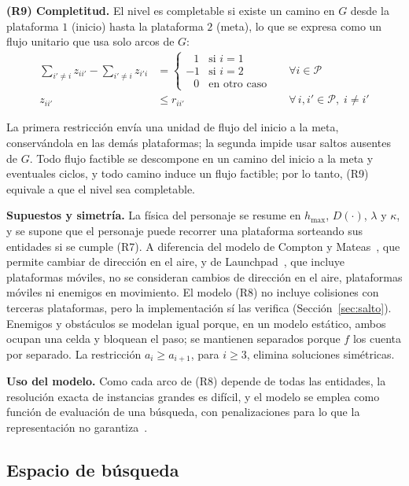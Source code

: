 \documentclass[letter, 10pt]{article}
\begin{document}
\textbf{(R9) Completitud.} El nivel es completable si existe un camino en $G$ desde la plataforma $1$ (inicio) hasta la plataforma $2$ (meta), lo que se expresa como un flujo unitario que usa solo arcos de $G$:
\begin{align}
\sum_{i' \neq i} z_{ii'} - \sum_{i' \neq i} z_{i'i} &= \begin{cases} \;\;\,1 & \text{si } i = 1 \\ -1 & \text{si } i = 2 \\ \;\;\,0 & \text{en otro caso} \end{cases} && \forall i \in \mathcal{P} \\
z_{ii'} &\leq r_{ii'} && \forall\, i, i' \in \mathcal{P},\; i \neq i'
\end{align}

La primera restricci\'on env\'ia una unidad de flujo del inicio a la meta, conserv\'andola en las dem\'as plataformas; la segunda impide usar saltos ausentes de $G$. Todo flujo factible se descompone en un camino del inicio a la meta y eventuales ciclos, y todo camino induce un flujo factible; por lo tanto, (R9) equivale a que el nivel sea completable.

\textbf{Supuestos y simetr\'ia.} La f\'isica del personaje se resume en $h_{\max}$, $D(\cdot)$, $\lambda$ y $\kappa$, y se supone que el personaje puede recorrer una plataforma sorteando sus entidades si se cumple (R7). A diferencia del modelo de Compton y Mateas~\cite{Compton2006}, que permite cambiar de direcci\'on en el aire, y de Launchpad~\cite{Smith2011}, que incluye plataformas m\'oviles, no se consideran cambios de direcci\'on en el aire, plataformas m\'oviles ni enemigos en movimiento. El modelo (R8) no incluye colisiones con terceras plataformas, pero la implementaci\'on s\'i las verifica (Secci\'on~\ref{sec:salto}). Enemigos y obst\'aculos se modelan igual porque, en un modelo est\'atico, ambos ocupan una celda y bloquean el paso; se mantienen separados porque $f$ los cuenta por separado. La restricci\'on $a_i \geq a_{i+1}$, para $i \geq 3$, elimina soluciones sim\'etricas.

\textbf{Uso del modelo.} Como cada arco de (R8) depende de todas las entidades, la resoluci\'on exacta de instancias grandes es dif\'icil, y el modelo se emplea como funci\'on de evaluaci\'on de una b\'usqueda, con penalizaciones para lo que la representaci\'on no garantiza~\cite{Dahlskog2013,DePontes2022}.

\subsection{Espacio de b\'usqueda}
\label{sec:espacio}
\end{document}
